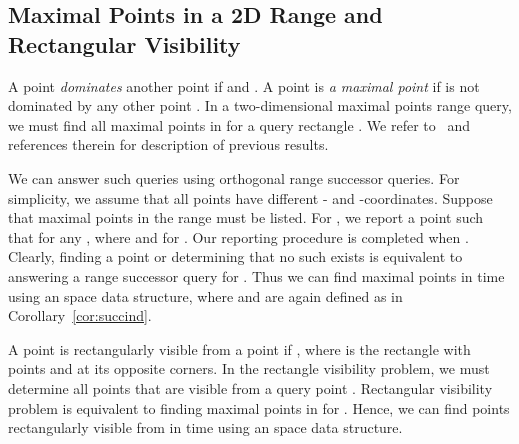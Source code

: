 \documentclass[11pt]{article}
\begin{document}
\subsection{Maximal  Points in a 2D Range and Rectangular Visibility}

A point  \emph{dominates} another point  if  
and . A point  is \emph{a maximal point} 
if  is not dominated by any other point . 
In a two-dimensional maximal points range  query, we must find  
all maximal points in   for a query rectangle .
We refer to~\cite{BT11} and references therein for description of 
previous results.

We can answer such  queries using orthogonal range successor queries. 
For simplicity, we assume that all points have different - and -coordinates.
Suppose that maximal points in the range 
 must be listed. For , we report a point  
 such that  for any , where 
 and  for .
 Our reporting procedure is completed when .
Clearly, finding a point  or determining that no such  
exists is equivalent to answering a range successor query for 
. Thus we can find  maximal points in 
 time using an  space data structure, 
where  and  are again defined as in Corollary~\ref{cor:succind}.

A point  is rectangularly visible from a point  
if , where  is the rectangle 
with points  and  at its opposite corners. 
In the rectangle visibility problem, we must determine all 
points  that are visible from a query point .  
Rectangular visibility problem is equivalent to 
finding maximal points in  for .
Hence, we can find points rectangularly visible from 
 in  time using an  space data structure. 



\end{document}
